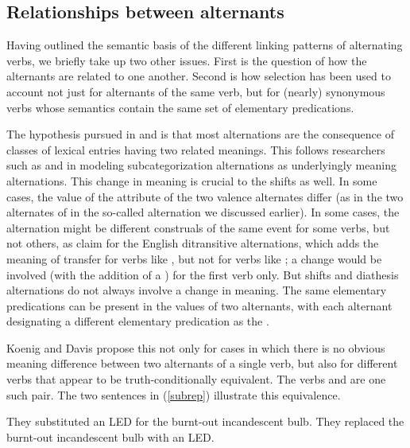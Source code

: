 \documentclass[output=paper
	        ,collection
	        ,collectionchapter
 	        ,biblatex
                ,babelshorthands
                ,newtxmath
                ,draftmode
                ,colorlinks, citecolor=brown
]{langscibook}
\begin{document}
\subsection{Relationships between alternants}

Having outlined the semantic basis of the different linking patterns of alternating verbs, we briefly take up two other issues.
First is the question of how the alternants are related to one another.
Second is how  selection has been used to account not just for alternants of the same verb, but for (nearly) synonymous verbs whose semantics contain the same set of elementary predications.

The hypothesis pursued in \citet{Davis1996} and \citet{Davis2001}  is that 
most alternations are the consequence of classes of lexical entries having
two related meanings. This follows researchers such as \citet{Pinker1989} and \citet{Levin1993} in modeling subcategorization alternations as underlyingly meaning alternations. 
This change in meaning is crucial to the \citet{KoenigandDavis2006}  shifts as well. In some cases, the value of the \rels attribute of the two valence alternates differ (as in the two alternates of  in the so-called  alternation we discussed earlier).
In some cases, the alternation might be different construals of the same event for some verbs, but not others, as \citet{RappaportandLevin2008} claim for the English ditransitive  alternations, which adds the meaning of transfer for verbs like , but not for verbs like ; a  change would be involved (with the addition of a ) for the first verb only. But  shifts and diathesis alternations do not always involve a change in meaning. The same elementary predications can be present in the  values of two alternants, with each alternant designating a different elementary predication as the . 

Koenig and Davis propose this not only for cases in which there is no obvious meaning difference between two alternants of a single verb, but also for different verbs that appear to be truth-conditionally equivalent.
The verbs  and  are one such pair.
The two sentences in (\ref{subrep}) illustrate this equivalence.

\begin{exe}
\ex\label{subrep}
\begin{xlist}
\ex\label{subrepa}They substituted an LED for the burnt-out incandescent bulb.
\ex\label{subrepb}They replaced the burnt-out incandescent bulb with an LED.
\end{xlist}
\end{exe}
\end{document}
